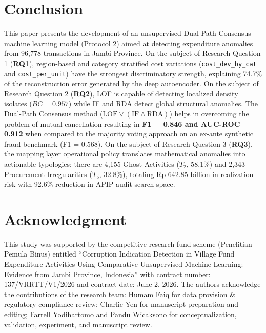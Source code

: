 \documentclass[conference]{IEEEtran}
\begin{document}
\section{Conclusion}

This paper presents the development of an unsupervised Dual-Path Consensus machine learning model (Protocol 2) aimed at detecting expenditure anomalies from 96,778 transactions in Jambi Province. On the subject of Research Question 1  (\textbf{RQ1}), region-based and category stratified cost variations (\texttt{cost\_dev\_by\_cat} and \texttt{cost\_per\_unit}) have the strongest discriminatory strength, explaining 74.7\% of the reconstruction error generated by the deep autoencoder. On the subject of Research Question 2  (\textbf{RQ2}), LOF is capable of detecting localized density isolates ($BC = 0.957$) while IF and RDA detect global structural anomalies. The Dual-Path Consensus method ($\text{LOF} \lor (\text{IF} \land \text{RDA})$) helps in overcoming the problem of mutual cancellation resulting in \textbf{F1 = 0.846 and AUC-ROC = 0.912} when compared to the majority voting approach on an ex-ante synthetic fraud benchmark (F1 = 0.568). On the subject of Research Question 3 (\textbf{RQ3}), the mapping layer operational policy translates mathematical anomalies into actionable typologies; there are 4,155 Ghost Activities ($T_2$, 58.1\%) and 2,343 Procurement Irregularities ($T_5$, 32.8\%), totaling Rp 642.85 billion in realization risk with 92.6\% reduction in APIP audit search space.

\section*{Acknowledgment}
This study was supported by the competitive research fund scheme (Penelitian Pemula Binus) entitled “Corruption Indication Detection in Village Fund Expenditure Activities Using Comparative Unsupervised Machine Learning: Evidence from Jambi Province, Indonesia” with contract number: 137/VRRTT/V1/2026 and contract date: June 2, 2026. The authors acknowledge the contributions of the research team:  Humam Faiq for data provision \& regulatory compliance review; Charlie Yen for manuscript preparation and editing; Farrell Yodihartomo and Pandu Wicaksono for conceptualization, validation, experiment, and manuscript review.
\end{document}

